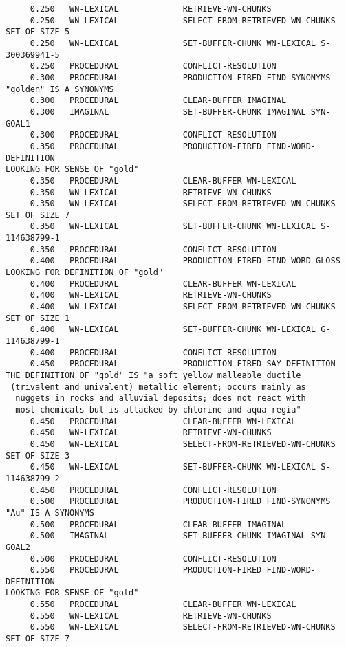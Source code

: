 \begin{verbatim}
     0.250   WN-LEXICAL             RETRIEVE-WN-CHUNKS 
     0.250   WN-LEXICAL             SELECT-FROM-RETRIEVED-WN-CHUNKS SET OF SIZE 5 
     0.250   WN-LEXICAL             SET-BUFFER-CHUNK WN-LEXICAL S-300369941-5 
     0.250   PROCEDURAL             CONFLICT-RESOLUTION 
     0.300   PROCEDURAL             PRODUCTION-FIRED FIND-SYNONYMS 
"golden" IS A SYNONYMS 
     0.300   PROCEDURAL             CLEAR-BUFFER IMAGINAL 
     0.300   IMAGINAL               SET-BUFFER-CHUNK IMAGINAL SYN-GOAL1 
     0.300   PROCEDURAL             CONFLICT-RESOLUTION 
     0.350   PROCEDURAL             PRODUCTION-FIRED FIND-WORD-DEFINITION 
LOOKING FOR SENSE OF "gold" 
     0.350   PROCEDURAL             CLEAR-BUFFER WN-LEXICAL 
     0.350   WN-LEXICAL             RETRIEVE-WN-CHUNKS 
     0.350   WN-LEXICAL             SELECT-FROM-RETRIEVED-WN-CHUNKS SET OF SIZE 7 
     0.350   WN-LEXICAL             SET-BUFFER-CHUNK WN-LEXICAL S-114638799-1 
     0.350   PROCEDURAL             CONFLICT-RESOLUTION 
     0.400   PROCEDURAL             PRODUCTION-FIRED FIND-WORD-GLOSS 
LOOKING FOR DEFINITION OF "gold" 
     0.400   PROCEDURAL             CLEAR-BUFFER WN-LEXICAL 
     0.400   WN-LEXICAL             RETRIEVE-WN-CHUNKS 
     0.400   WN-LEXICAL             SELECT-FROM-RETRIEVED-WN-CHUNKS SET OF SIZE 1 
     0.400   WN-LEXICAL             SET-BUFFER-CHUNK WN-LEXICAL G-114638799-1 
     0.400   PROCEDURAL             CONFLICT-RESOLUTION 
     0.450   PROCEDURAL             PRODUCTION-FIRED SAY-DEFINITION 
THE DEFINITION OF "gold" IS "a soft yellow malleable ductile 
 (trivalent and univalent) metallic element; occurs mainly as
  nuggets in rocks and alluvial deposits; does not react with
  most chemicals but is attacked by chlorine and aqua regia" 
     0.450   PROCEDURAL             CLEAR-BUFFER WN-LEXICAL 
     0.450   WN-LEXICAL             RETRIEVE-WN-CHUNKS 
     0.450   WN-LEXICAL             SELECT-FROM-RETRIEVED-WN-CHUNKS SET OF SIZE 3 
     0.450   WN-LEXICAL             SET-BUFFER-CHUNK WN-LEXICAL S-114638799-2 
     0.450   PROCEDURAL             CONFLICT-RESOLUTION 
     0.500   PROCEDURAL             PRODUCTION-FIRED FIND-SYNONYMS 
"Au" IS A SYNONYMS 
     0.500   PROCEDURAL             CLEAR-BUFFER IMAGINAL 
     0.500   IMAGINAL               SET-BUFFER-CHUNK IMAGINAL SYN-GOAL2 
     0.500   PROCEDURAL             CONFLICT-RESOLUTION 
     0.550   PROCEDURAL             PRODUCTION-FIRED FIND-WORD-DEFINITION 
LOOKING FOR SENSE OF "gold" 
     0.550   PROCEDURAL             CLEAR-BUFFER WN-LEXICAL 
     0.550   WN-LEXICAL             RETRIEVE-WN-CHUNKS 
     0.550   WN-LEXICAL             SELECT-FROM-RETRIEVED-WN-CHUNKS SET OF SIZE 7 

\end{verbatim}
